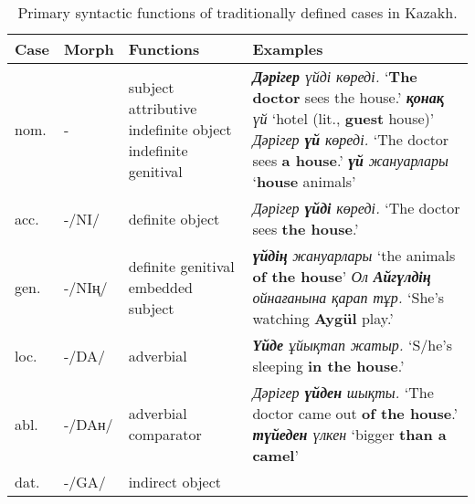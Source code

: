 \documentclass[a4paper,11pt, onecolumn,twoside]{article}
\newcommand{\kazakh}[1]{{\em #1}}
\newcommand{\gloss}[1]{`#1'}
\begin{document}
\begin{table}[htbp]
	\centering
	\caption{Primary syntactic functions of traditionally defined cases in Kazakh.}\label{tab:cases}
	\begin{small}
		\begin{tabular}{l l p{9em} p{27.15em}}
			\toprule
				\textbf{Case} & \textbf{Morph} & \textbf{Functions} & \textbf{Examples} \\
			\midrule
				nom. & - & subject\newline
										attributive\newline
										indefinite object\newline
										indefinite genitival 
									& \kazakh{\textbf{Дәрігер} үйді көреді.} \gloss{\textbf{The doctor} sees the house.} \newline
										\kazakh{\textbf{қонақ} үй} \gloss{hotel (lit., \textbf{guest} house)} \newline 
										\kazakh{Дәрігер \textbf{үй} көреді.} \gloss{The doctor sees \textbf{a house}.}\newline
										\kazakh{\textbf{үй} жануарлары} \gloss{\textbf{house} animals} \\\midrule
				acc. & -/NI/ & definite object %
										& \kazakh{Дәрігер \textbf{үйді} көреді.} \gloss{The doctor sees \textbf{the house}.}
										\\\midrule
				gen. & -/NIң/ & definite genitival\newline
											embedded subject
										& \kazakh{\textbf{үйдің} жануарлары} \gloss{the animals \textbf{of the house}} \newline
											\kazakh{Ол \textbf{Айгүлдің} ойнағанына қарап тұр.} \gloss{She's watching \textbf{Aygül} play.} \\\midrule
				loc. & -/DA/ & adverbial
										& \kazakh{\textbf{Үйде} ұйықтап жатыр.} \gloss{S/he's sleeping \textbf{in the house}.} \\\midrule
				abl. & -/DAн/ & adverbial\newline
											comparator 
										& \kazakh{Дәрігер \textbf{үйден} шықты.} \gloss{The doctor came out \textbf{of the house}.}\newline
											\kazakh{\textbf{түйеден} үлкен} \gloss{bigger \textbf{than a camel}}\\\midrule
				dat. & -/GA/ & indirect object\newline

\end{tabular}
\end{small}
\end{table}
\end{document}
